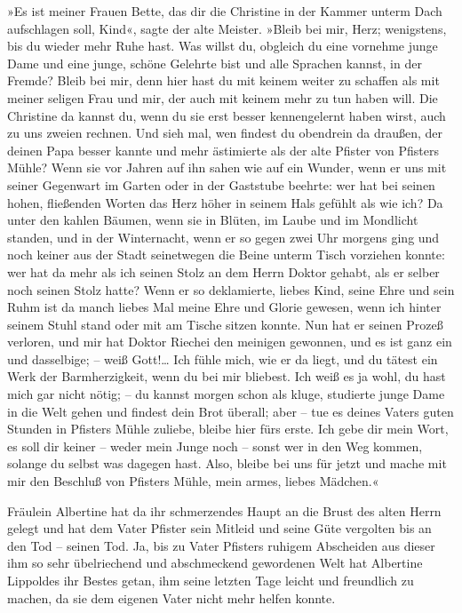 »Es ist meiner Frauen Bette, das dir die Christine in der Kammer
unterm Dach aufschlagen soll, Kind«, sagte der alte Meister. »Bleib
bei mir, Herz; wenigstens, bis du wieder mehr Ruhe hast. Was willst
du, obgleich du eine vornehme junge Dame und eine junge, schöne
Gelehrte bist und alle Sprachen kannst, in der Fremde? Bleib bei
mir, denn hier hast du mit keinem weiter zu schaffen als mit meiner
seligen Frau und mir, der auch mit keinem mehr zu tun haben will.
Die Christine da kannst du, wenn du sie erst besser kennengelernt
haben wirst, auch zu uns zweien rechnen. Und sieh mal, wen findest
du obendrein da draußen, der deinen Papa besser kannte und mehr
ästimierte als der alte Pfister von Pfisters Mühle? Wenn sie vor
Jahren auf ihn sahen wie auf ein Wunder, wenn er uns mit seiner
Gegenwart im Garten oder in der Gaststube beehrte: wer hat bei
seinen hohen, fließenden Worten das Herz höher in seinem Hals
gefühlt als wie ich? Da unter den kahlen Bäumen, wenn sie in
Blüten, im Laube und im Mondlicht standen, und in der Winternacht,
wenn er so gegen zwei Uhr morgens ging und noch keiner aus der
Stadt seinetwegen die Beine unterm Tisch vorziehen konnte: wer hat
da mehr als ich seinen Stolz an dem Herrn Doktor gehabt, als er
selber noch seinen Stolz hatte? Wenn er so deklamierte, liebes
Kind, seine Ehre und sein Ruhm ist da manch liebes Mal meine Ehre
und Glorie gewesen, wenn ich hinter seinem Stuhl stand oder mit am
Tische sitzen konnte. Nun hat er seinen Prozeß verloren, und mir
hat Doktor Riechei den meinigen gewonnen, und es ist ganz ein und
dasselbige; – weiß Gott!\ldots{} Ich fühle mich, wie er da liegt, und du
tätest ein Werk der Barmherzigkeit, wenn du bei mir bliebest. Ich
weiß es ja wohl, du hast mich gar nicht nötig; – du kannst morgen
schon als kluge, studierte junge Dame in die Welt gehen und findest
dein Brot überall; aber – tue es deines Vaters guten Stunden in
Pfisters Mühle zuliebe, bleibe hier fürs erste. Ich gebe dir mein
Wort, es soll dir keiner – weder mein Junge noch – sonst wer in den
Weg kommen, solange du selbst was dagegen hast. Also, bleibe bei
uns für jetzt und mache mit mir den Beschluß von Pfisters Mühle,
mein armes, liebes Mädchen.«

Fräulein Albertine hat da ihr schmerzendes Haupt an die Brust des
alten Herrn gelegt und hat dem Vater Pfister sein Mitleid und seine
Güte vergolten bis an den Tod – seinen Tod. Ja, bis zu Vater
Pfisters ruhigem Abscheiden aus dieser ihm so sehr übelriechend und
abschmeckend gewordenen Welt hat Albertine Lippoldes ihr Bestes
getan, ihm seine letzten Tage leicht und freundlich zu machen, da
sie dem eigenen Vater nicht mehr helfen konnte.

